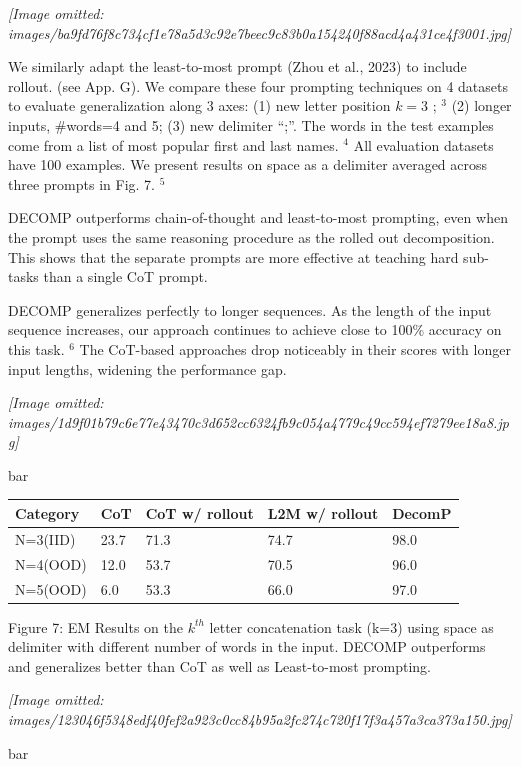 \documentclass[
]{article}
\newcounter{none} %
\begin{document}
\textit{[Image omitted: images/ba9fd76f8c734cf1e78a5d3c92e7beec9c83b0a154240f88acd4a431ce4f3001.jpg]}

We similarly adapt the least-to-most prompt (Zhou et al., 2023) to
include rollout. (see App. G). We compare these four prompting
techniques on 4 datasets to evaluate generalization along 3 axes: (1)
new letter position \(k = 3\) ; \(^{3}\) (2) longer inputs, \#words=4
and 5; (3) new delimiter ``;''. The words in the test examples come from
a list of most popular first and last names. \(^{4}\) All evaluation
datasets have 100 examples. We present results on space as a delimiter
averaged across three prompts in Fig. 7. \(^{5}\)

DECOMP outperforms chain-of-thought and least-to-most prompting, even
when the prompt uses the same reasoning procedure as the rolled out
decomposition. This shows that the separate prompts are more effective
at teaching hard sub-tasks than a single CoT prompt.

DECOMP generalizes perfectly to longer sequences. As the length of the
input sequence increases, our approach continues to achieve close to
100\% accuracy on this task. \(^{6}\) The CoT-based approaches drop
noticeably in their scores with longer input lengths, widening the
performance gap.

\textit{[Image omitted: images/1d9f01b79c6e77e43470c3d652cc6324fb9c054a4779c49cc594ef7279ee18a8.jpg]}

bar

{\def\LTcaptype{none} %
\begin{longtable}[]{@{}lllll@{}}
\toprule\noalign{}
Category & CoT & CoT w/ rollout & L2M w/ rollout & DecomP \\
\midrule\noalign{}
\endhead
\bottomrule\noalign{}
\endlastfoot
N=3(IID) & 23.7 & 71.3 & 74.7 & 98.0 \\
N=4(OOD) & 12.0 & 53.7 & 70.5 & 96.0 \\
N=5(OOD) & 6.0 & 53.3 & 66.0 & 97.0 \\
\end{longtable}
}

Figure 7: EM Results on the \(k^{th}\) letter concatenation task (k=3)
using space as delimiter with different number of words in the input.
DECOMP outperforms and generalizes better than CoT as well as
Least-to-most prompting.

\textit{[Image omitted: images/123046f5348edf40fef2a923c0cc84b95a2fc274c720f17f3a457a3ca373a150.jpg]}

bar
\end{document}
